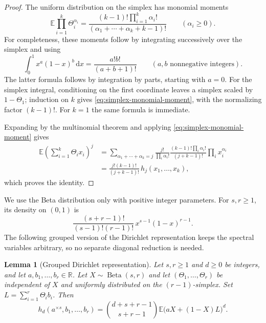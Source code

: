 \documentclass[11pt]{article}
\newtheorem{lemma}[theorem]{Lemma}
\numberwithin{equation}{section}
\newcommand{\R}{\mathbb R}
\newcommand{\dd}{\,\mathrm d}
\newcommand{\E}{\mathbb E}
\newcommand{\BetaLaw}{\operatorname{Beta}}
\begin{document}
\begin{proof}
  The uniform distribution on the simplex has monomial moments
  \begin{equation}\label{eq:simplex-monomial-moment}
    \E\prod_{i=1}^k\Theta_i^{\alpha_i}
      =\frac{(k-1)!\prod_{i=1}^k\alpha_i!}
             {(\alpha_1+\cdots+\alpha_k+k-1)!}
      \qquad(\alpha_i\ge0).
  \end{equation}
  For completeness, these moments follow by integrating successively
  over the simplex and using
  \[
    \int_0^1x^a(1-x)^b\dd x=\frac{a!b!}{(a+b+1)!}
    \qquad(a,b\text{ nonnegative integers}).
  \]
  The latter formula follows by integration by parts, starting with
  $a=0$. For the simplex integral, conditioning on the first
  coordinate leaves a simplex scaled by $1-\Theta_1$; induction on
  $k$ gives \eqref{eq:simplex-monomial-moment}, with the normalizing
  factor $(k-1)!$. For $k=1$ the same formula is immediate.

  Expanding by the multinomial theorem and applying
  \eqref{eq:simplex-monomial-moment} gives
  \begin{align*}
    \E\left(\sum_{i=1}^k\Theta_i x_i\right)^j
      &=\sum_{\alpha_1+\cdots+\alpha_k=j}
        \frac{j!}{\prod_i\alpha_i!}
        \frac{(k-1)!\prod_i\alpha_i!}{(j+k-1)!}
        \prod_i x_i^{\alpha_i}\\
      &=\frac{j!(k-1)!}{(j+k-1)!}\,
          h_j(x_1,\ldots,x_k),
  \end{align*}
  which proves the identity.
\end{proof}

We use the Beta distribution only with positive integer parameters.
For $s,r\ge1$, its density on $(0,1)$ is
\begin{equation}\label{eq:beta-density}
  \frac{(s+r-1)!}{(s-1)!(r-1)!}\,
    x^{s-1}(1-x)^{r-1}.
\end{equation}
The following grouped version of the Dirichlet representation keeps
the spectral variables arbitrary, so no separate diagonal reduction
is needed.

\begin{lemma}[Grouped Dirichlet representation]
\label{lem:grouped-dirichlet}
  Let $s,r\ge1$ and $d\ge0$ be integers, and let
  $a,b_1,\ldots,b_r\in\R$. Let
  $X\sim\BetaLaw(s,r)$ and let
  $(\Theta_1,\ldots,\Theta_r)$ be independent of $X$ and uniformly
  distributed on the $(r-1)$-simplex. Set
  $L=\sum_{i=1}^r\Theta_i b_i$. Then
  \begin{equation}\label{eq:grouped-dirichlet}
    h_d(a^{\times s},b_1,\ldots,b_r)
      =\binom{d+s+r-1}{s+r-1}
        \E\bigl(aX+(1-X)L\bigr)^d.
  \end{equation}
\end{lemma}
\end{document}
